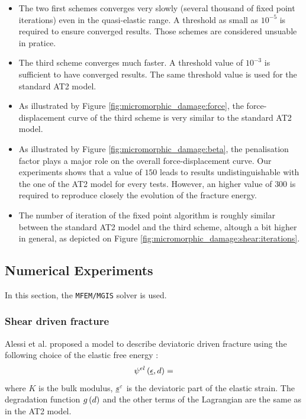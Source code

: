 \begin{itemize}
  \item The two first schemes converges very slowly (several thousand of fixed
  point iterations) even in the quasi-elastic range. A threshold as
  small as \(10^{-5}\) is required to ensure converged results. Those
  schemes are considered unsuable in pratice.
  \item The third scheme converges much faster. A threshold value of
  \(10^{-3}\) is sufficient to have converged results. The same
  threshold value is used for the standard AT2 model.
  \item As illustrated by Figure \ref{fig:micromorphic_damage:force}, the
  force-displacement curve of the third scheme is very similar to the
  standard AT2 model.
  \item As illustrated by Figure \ref{fig:micromorphic_damage:beta}, the
  penalisation factor plays a major role on the overall
  force-displacement curve. Our experiments shows that a value of
  \(150\) leads to results undistinguishable with the one of the AT2
  model for every tests. However, an higher value of \(300\) is
  required to reproduce closely the evolution of the fracture energy.
  \item The number of iteration of the fixed point algorithm is roughly
  similar between the standard AT2 model and the third scheme, altough a
  bit higher in general, as depicted on Figure
  \ref{fig:micromorphic_damage:shear:iterations}.
\end{itemize}

\subsection{Numerical Experiments}
\label{sec:micromorphicdamage:numerical_experiments}

In this section, the \texttt{MFEM/MGIS} solver is used.

\subsubsection{Shear driven fracture}

Alessi et al. proposed a model to describe deviatoric driven fracture
using the following choice of the elastic free energy
\cite{alessi_phase-field_2020}:
\[
{\psi}^{el}\left(\underline{\epsilon}, d\right)=
\]
where \(K\) is the bulk modulus, \(\underline{s}^{\varepsilon}\) is the
deviatoric part of the elastic strain. The degradation function
\(g\left(d\right)\) and the other terms of the Lagrangian are the same as in
the AT2 model.

